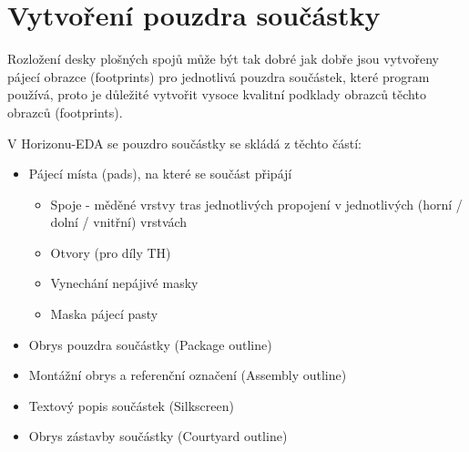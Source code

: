 \documentclass[letterpaper,10pt,czech]{sphinxmanual}
\begin{document}
\chapter{Vytvoření pouzdra součástky}
\label{\detokenize{create-package:vytvoreni-pouzdra-soucastky}}\label{\detokenize{create-package::doc}}
Rozložení desky plošných spojů může být tak dobré jak dobře jsou vytvořeny pájecí obrazce (footprints) pro jednotlivá pouzdra součástek, které program používá, proto je důležité vytvořit vysoce kvalitní podklady obrazců těchto obrazců (footprints).

V Horizonu-EDA se pouzdro součástky se skládá z těchto částí:
\begin{itemize}
\item {} 
Pájecí místa (pads), na které se součást připájí
\begin{itemize}
\item {} 
Spoje - měděné vrstvy tras jednotlivých propojení v jednotlivých (horní / dolní / vnitřní) vrstvách

\item {} 
Otvory (pro díly TH)

\item {} 
Vynechání nepájivé masky

\item {} 
Maska pájecí pasty

\end{itemize}

\item {} 
Obrys pouzdra součástky (Package outline)

\item {} 
Montážní obrys a referenční označení (Assembly outline)

\item {} 
Textový popis součástek (Silkscreen)

\item {} 
Obrys zástavby součástky (Courtyard outline)

\end{itemize}
\end{document}
